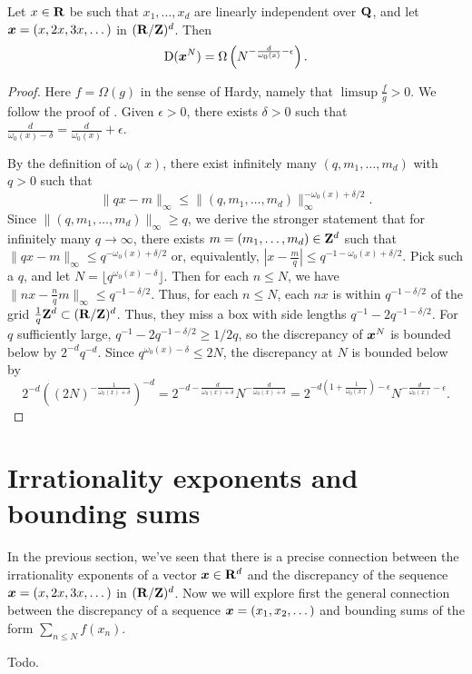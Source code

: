 \begin{theorem}
Let $x\in \mathbf{R}$ be such that $x_1,\dots,x_d$ are linearly independent over 
$\mathbf{Q}$, and let ${\boldsymbol x}=(x,2x,3x,\dots)$ in $(\mathbf{R}/\mathbf{Z})^d$. Then 
\[
	\operatorname{D}({\boldsymbol x}^N) = \Omega\left(N^{-\frac{d}{\omega_0(x)}-\epsilon} \right).
\]
\end{theorem}
\begin{proof}
Here $f=\Omega(g)$ in the sense of Hardy, namely that $\limsup \frac f g>0$. We 
follow the proof of \cite[Ch.~2, Th.~3.3]{kuipers-niederreiter-1974}. Given 
$\epsilon>0$, there exists $\delta>0$ such that 
$\frac{d}{\omega_0(x)-\delta} = \frac{d}{\omega_0(x)} + \epsilon$. 

By the definition of $\omega_0(x)$, there exist infinitely many 
$(q,m_1,\dots,m_d)$ with $q>0$ such that 
\[
	\|q x - m\|_\infty \leqslant \|(q,m_1,\dots,m_d)\|_\infty^{-\omega_0(x)+\delta/2} .
\]
Since $\|(q,m_1,\dots,m_d)\|_\infty \geqslant q$, we derive the stronger 
statement that for infinitely many $q\to \infty$, there exists 
$m=(m_1,\dots,m_d)\in \mathbf{Z}^d$ such that 
$\|q x-m\|_\infty \leqslant q^{-\omega_0(x)+\delta/2}$ or, equivalently, 
$|x-\frac m q| \leqslant q^{-1-\omega_0(x)+\delta/2}$. Pick such a $q$, and let 
$N=\lfloor q^{\omega_0(x)-\delta}\rfloor$. Then for each $n\leqslant N$, we 
have $\|n x - \frac n q m\|_\infty \leqslant q^{-1-\delta/2}$. Thus, for each 
$n\leqslant N$, each $n x$ is within $q^{-1-\delta/2}$ of the grid 
$\frac 1 q \mathbf{Z}^d\subset (\mathbf{R}/\mathbf{Z})^d$. Thus, they miss a box with side lengths 
$q^{-1} - 2 q^{-1-\delta/2}$. For $q$ sufficiently large, 
$q^{-1} - 2 q^{-1-\delta/2} \geqslant 1/2q$, so the discrepancy of ${\boldsymbol x}^N$ is 
bounded below by $2^{-d} q^{-d}$. Since $q^{\omega_0(x)-\delta} \leqslant 2 N$, 
the discrepancy at $N$ is bounded below by 
\[
	2^{-d} \left( (2 N)^{-\frac{1}{\omega_0(x)+\delta}}\right)^{-d} 
		= 2^{-d-\frac{d}{\omega_0(x)+\delta}} N^{-\frac{d}{\omega_0(x)+\delta}}
		= 2^{-d\left(1+\frac{1}{\omega_0(x)}\right)-\epsilon} N^{-\frac{d}{\omega_0(x)}-\epsilon} .
\]
\end{proof}





\section{Irrationality exponents and bounding sums}

In the previous section, we've seen that there is a precise connection between 
the irrationality exponents of a vector ${\boldsymbol x}\in \mathbf{R}^d$ and the discrepancy of 
the sequence ${\boldsymbol x}=(x,2x,3x,\dots)$ in $(\mathbf{R}/\mathbf{Z})^d$. Now we will explore first 
the general connection between the discrepancy of a sequence 
${\boldsymbol x}=(x_1,x_2,\dots)$ and bounding sums of the form 
$\sum_{n\leqslant N} f(x_n)$. 

\begin{theorem}
Todo.
\end{theorem}
